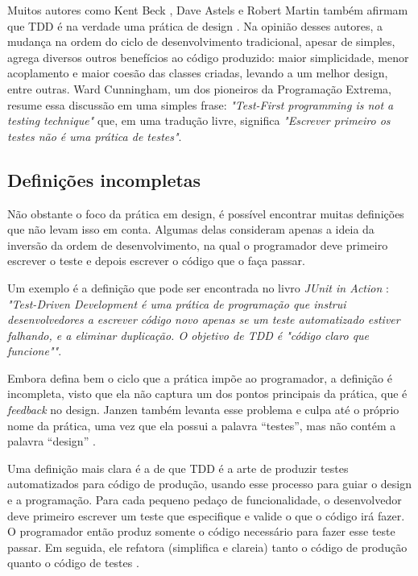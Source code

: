 Muitos autores como Kent Beck \cite{aim-fire}, Dave Astels \cite{astels-tdd} e
Robert Martin \cite{bob-martin} também afirmam que TDD é na verdade uma prática de
design \cite{tdd-taxonomy} \cite{aim-fire}.
Na opinião desses autores, a mudança na ordem do ciclo de
desenvolvimento tradicional, apesar de simples, agrega diversos outros
benefícios ao código produzido: maior simplicidade, menor acoplamento e maior
coesão das classes criadas, levando a um melhor design, entre
outras. Ward Cunningham, um dos pioneiros da Programação Extrema, resume essa 
discussão em uma simples frase: \textit{"Test-First programming is not a testing technique"} 
que, em uma tradução livre, significa \textit{"Escrever primeiro os testes
não é uma prática de testes"}.

\subsection{Definições incompletas}

Não obstante o foco da prática em design, é possível encontrar muitas definições que
não levam isso em conta. Algumas delas consideram apenas a ideia da
inversão da ordem de desenvolvimento, na qual o programador deve primeiro
escrever o teste e depois escrever o código que o faça passar.

Um exemplo é a definição que pode ser encontrada no livro \textit{JUnit
in Action} \cite{junit-in-action}: \textit{"Test-Driven Development é uma
prática de programação que instrui desenvolvedores a escrever código novo
apenas se um teste automatizado estiver falhando, e a eliminar duplicação. O
objetivo de TDD é "código claro que funcione""}.

Embora defina bem o ciclo que a prática impõe ao programador, a definição é incompleta, visto
que ela não captura um dos pontos principais da prática, que é \textit{feedback} no design. 
Janzen também levanta esse problema e culpa até o próprio nome da prática, uma vez
que ela possui a palavra ``testes'', mas não contém a palavra ``design'' 
\cite{tdd-really-improve}.

Uma definição mais clara é a de que TDD é a arte de produzir testes
automatizados para código de produção, usando esse processo para guiar o design e a programação.
Para cada pequeno pedaço de funcionalidade, o desenvolvedor deve primeiro
escrever um teste que especifique e valide o que o código irá fazer. O
programador então produz somente o código necessário para fazer esse teste
passar. Em seguida, ele refatora (simplifica e clareia) tanto o código de produção
quanto o código de testes \cite{agilealliance-tdd} \cite{tdd-taxonomy}.


